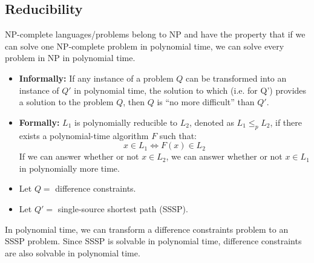 \subsection{Reducibility}
\begin{intuition}
    NP-complete languages/problems belong to NP and have the property that if we can solve one NP-complete problem in polynomial time, we can solve every problem in NP in polynomial time.
\end{intuition}
\begin{definition}
    \begin{itemize}
        \item \textbf{Informally:} If any instance of a problem $Q$ can be transformed into an instance of $Q'$ in polynomial time, the solution to which (i.e. for Q') provides a solution to the problem $Q$, then $Q$ is ``no more difficult'' than $Q'$.
    
        \item \textbf{Formally:} $L_1$ is polynomially reducible to $L_2$, denoted as $L_1 \leq_p L_2$, if there exists a polynomial-time algorithm $F$ such that:
        \[
        x \in L_1 \iff F(x) \in L_2
        \]
        If we can answer whether or not $x \in L_2$, we can answer whether or not $x \in L_1$ in polynomially more time.
    
    \end{itemize}
\end{definition}

\begin{example}
    \begin{itemize}
        \item Let $Q = $ difference constraints.
        \item Let $Q' = $ single-source shortest path (SSSP).
    \end{itemize}
    In polynomial time, we can transform a difference constraints problem to an SSSP problem. Since SSSP is solvable in polynomial time, difference constraints are also solvable in polynomial time.
\end{example}

